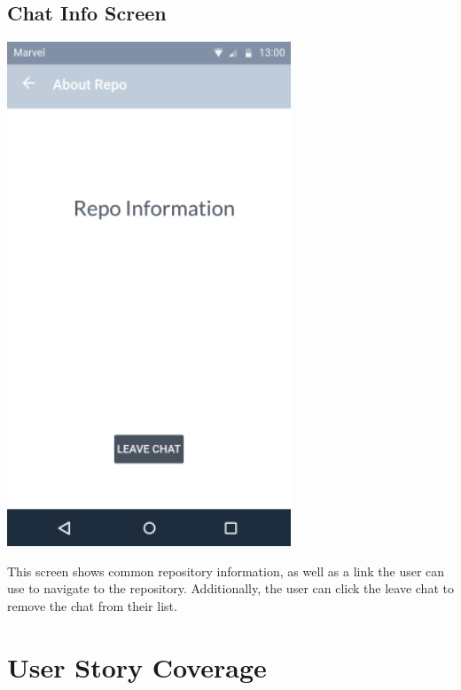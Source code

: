 \documentclass{report}
\begin{document}
\subsection{Chat Info Screen}
\begin{center}
    \includegraphics[scale=0.6]{design-chat-info}
\end{center}
This screen shows common repository information, as well as a link the user can use to navigate to the repository. Additionally, the user can click the leave chat to remove the chat from their list.

\newpage
\section{User Story Coverage}
\end{document}
